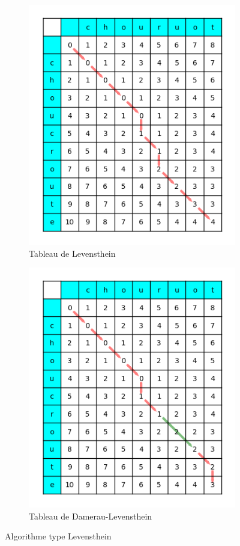 \documentclass[final, 10pt]{report}
\begin{document}
\begin{figure}
    \centering
    \begin{subfigure}{0.4\textwidth}
        \includegraphics[width=.90\textwidth]{img/Tableau_de_Levenshtein.png}
        \caption{Tableau de Levensthein}
        \label{fig:tab_levensthein}
    \end{subfigure}
    \begin{subfigure}{0.4\textwidth}
        \includegraphics[width=.90\textwidth]{img/Tableau_de_Damerau-Levenshtein.png}
        \caption{Tableau de Damerau-Levensthein}
        \label{fig:tab_damerau}
    \end{subfigure}
    \caption{Algorithme type Levensthein}
    \label{fig:algo_levensthein}
\end{figure}
    
\end{document}
